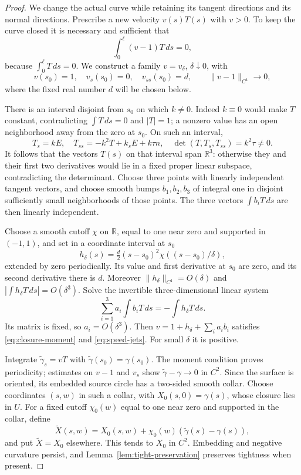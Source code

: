 \documentclass[11pt]{amsart}
\theoremstyle{definition}
\newcommand{\R}{\mathbb R}
\begin{document}
\begin{proof}
We change the actual curve while retaining its tangent directions
and its normal directions. Prescribe a new velocity $v(s)T(s)$
with $v>0$. To keep the curve closed it is necessary and sufficient
that
\begin{equation}\label{eq:closure-moment}
 \int_0^\ell(v-1)T\,ds=0,
\end{equation}
because $\int_0^\ell T\,ds=0$. We construct a family $v=v_\delta$,
$\delta\downarrow0$, with
\begin{equation}\label{eq:speed-jets}
 v(s_0)=1,\quad v_s(s_0)=0,\quad v_{ss}(s_0)=d,
 \qquad \|v-1\|_{C^1}\longrightarrow0,
\end{equation}
where the fixed real number $d$ will be chosen below.

There is an interval disjoint from $s_0$ on which $k\ne0$.
Indeed $k\equiv0$ would make $T$ constant, contradicting
$\int T\,ds=0$ and $|T|=1$; a nonzero value has an open
neighborhood away from the zero at $s_0$. On such an interval,
\[
 T_s=kE,\quad T_{ss}=-k^2T+k_sE+k\tau n,\quad
 \det(T,T_s,T_{ss})=k^2\tau\ne0.
\]
It follows that the vectors $T(s)$ on that interval span $\R^3$:
otherwise they and their first two derivatives would lie in a
fixed proper linear subspace, contradicting the determinant.
Choose three points with linearly independent tangent vectors,
and choose smooth bumps $b_1,b_2,b_3$ of integral one in
disjoint sufficiently small neighborhoods of those points.
The three vectors $\int b_iT\,ds$ are then linearly independent.

Choose a smooth cutoff $\chi$ on $\R$, equal to one near zero
and supported in $(-1,1)$, and set in a coordinate interval at $s_0$
\[
 h_\delta(s)=\tfrac d2(s-s_0)^2
                        \chi((s-s_0)/\delta),
\]
extended by zero periodically. Its value and first derivative at
$s_0$ are zero, and its second derivative there is $d$.
Moreover $\|h_\delta\|_{C^1}=O(\delta)$ and
$|\int h_\delta T\,ds|=O(\delta^3)$.
Solve the invertible three-dimensional linear system
\[
 \sum_{i=1}^3 a_i\int b_iT\,ds=-\int h_\delta T\,ds.
\]
Its matrix is fixed, so $a_i=O(\delta^3)$.
Then $v=1+h_\delta+\sum_i a_i b_i$ satisfies
\eqref{eq:closure-moment} and \eqref{eq:speed-jets}.
For small $\delta$ it is positive.

Integrate $\widetilde\gamma_s=vT$ with
$\widetilde\gamma(s_0)=\gamma(s_0)$. The moment condition proves
periodicity; estimates on $v-1$ and $v_s$ show
$\widetilde\gamma-\gamma\to0$ in $C^2$.
Since the surface is oriented, its embedded source circle has a
two-sided smooth collar. Choose coordinates $(s,w)$ in such a
collar, with $X_0(s,0)=\gamma(s)$, whose closure lies in $U$.
For a fixed cutoff $\chi_0(w)$ equal to one near zero and
supported in the collar, define
\[
 \widetilde X(s,w)=X_0(s,w)+
              \chi_0(w)(\widetilde\gamma(s)-\gamma(s)),
\]
and put $\widetilde X=X_0$ elsewhere.
This tends to $X_0$ in $C^2$. Embedding and negative curvature
persist, and Lemma~\ref{lem:tight-preservation} preserves
tightness when present.


\end{proof}
\end{document}
